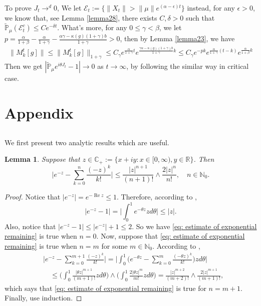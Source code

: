 \documentclass[12pt, a4paper]{amsart}
\newtheorem{lem}[thm]{Lemma}
\theoremstyle{definition}
\numberwithin{equation}{section}
\begin{document}
To prove $J_t\rightarrow^d 0$, We let $\mathcal{E}_t:=\{\|X_t\|>\|\mu\|e^{(\alpha-\epsilon )t}\}$ instead, for any $\epsilon>0$, we know that, see Lemma \ref{lemma28}, there exists
$C,\delta >0$ such that  $\mathbb{\tilde{P}}_{\mu}(\mathcal{E}_t^c)\leq C e^{-\delta t}$. What's more, for any $0\leq \gamma <\beta$, we let $p=\frac{\alpha}{1+\beta}-\frac{\alpha}{1+\gamma} - \frac{\alpha\gamma-\kappa(g)(1+\gamma)b}{1+\gamma}>0$, then by Lemma \ref{lemma23}, we have
\begin{align*}
    \|M_k^t[g]\|\leq \|M_k^t[g]\|_{1+\gamma}\leq C_{\gamma} e^{\frac{\alpha}{1+\gamma}t}e^{\frac{\gamma \alpha-\kappa(g)(1+\gamma)b}{1+\gamma}k}\leq C_{\gamma} e^{-pk}e^{\frac{\alpha}{1+\gamma}(t-k)}e^{\frac{\alpha}{1+\beta}k}
\end{align*}
Then we get $  \left|\mathbb{\tilde{P}}_{\mu}e^{i\theta J_t}-1\right|\rightarrow 0$ as $ t\rightarrow \infty$, by following the similar way in critical case.

\section{Appendix}

\subsection{}
    We first present two analytic results which are useful.
\begin{lem}
\label{lem: estimate of exponential remaining}
	Suppose that $z\in \mathbb C_+:= \{x+iy: x \in [0,\infty), y \in \mathbb R\}$. Then
\begin{equation}
\label{eq: estimate of exponential remaining}
	\Big|e^{-z} - \sum_{k=0}^n \frac{(-z)^k}{k!} \Big| 
	\leq \frac{|z|^{n+1}}{(n+1)!} \wedge \frac{2|z|^{n}}{n!}, \quad n\in \mathbb N_0.
\end{equation}
\end{lem}
\begin{proof}
	Notice that $|e^{-z}| = e^{- \operatorname{Re} z} \leq 1$. 
	Therefore, according to \cite[Theorem 7.20.]{Rudin1987Real},
\begin{equation}
	|e^{-z} - 1| = \Big| \int_0^1 e^{-\theta z} z d\theta\Big|
	\leq |z|. 
\end{equation}
	Also, notice that $|e^{-z} - 1| \leq |e^{-z}|+1 \leq 2$.
	So we have \eqref{eq: estimate of exponential remaining} is true when $n = 0$.
	Now, suppose that \eqref{eq: estimate of exponential remaining} is true when $n = m$ for some $m \in \mathbb N_0$.
	According to \cite[Theorem 7.20.]{Rudin1987Real},
\begin{align}
	&\Big|e^{-z} - \sum_{k=0}^{m+1} \frac{(-z)^k}{k!}\Big|
	= \Big| \int_0^1\Big(e^{-\theta z} - \sum_{k=0}^m \frac{(-\theta z)^k}{k!} \Big) z d\theta \Big|
	\\&\quad \leq  \Big(\int_0^1 \frac{|\theta z|^{m+1}}{(m+1)!} z d\theta\Big) \wedge \Big(\int_0^1 \frac{2|\theta z|^{m}}{m!} z d\theta\Big)
	= \frac{|z|^{m+2}}{(m+2)!} \wedge \frac{2|z|^{m+1}}{(m+1)!},
\end{align}
	which says that \eqref{eq: estimate of exponential remaining} is true for $n = m + 1$.
	Finally, use induction.
\end{proof}
\end{document}
